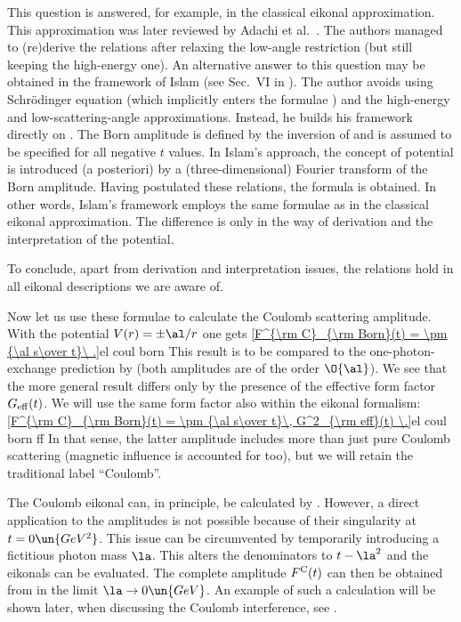 This question is answered, for example, in the classical eikonal approximation. This approximation was later reviewed by Adachi et al.~. The authors managed to (re)derive the relations  after relaxing the low-angle restriction (but still keeping the high-energy one). An alternative answer to this question may be obtained in the framework of Islam (see Sec.~VI in ). The author avoids using Schr\" odinger equation (which implicitly enters the formulae ) and the high-energy and low-scattering-angle approximations. Instead, he builds his framework directly on . The Born amplitude is defined by the inversion of  and is assumed to be specified for all negative $t$ values. In Islam's approach, the concept of potential is introduced (a posteriori) by a (three-dimensional) Fourier transform of the Born amplitude. Having postulated these relations, the formula  is obtained. In other words, Islam's framework employs the same formulae  as in the classical eikonal approximation. The difference is only in the way of derivation and the interpretation of the potential. 

To conclude, apart from derivation and interpretation issues, the relations  hold in all eikonal descriptions we are aware of.

Now let us use these formulae to calculate the Coulomb scattering amplitude. With the potential $V(r) = \pm \al/r$ one gets
\eqref{F^{\rm C}_{\rm Born}(t) = \pm {\al s\over t}\ .}{el coul born}
This result is to be compared to the one-photon-exchange prediction by   (both amplitudes are of the order $\O{\al}$). We see that the more general  result differs only by the presence of the effective form factor $G_{\rm eff}(t)$. We will use the same form factor also within the eikonal formalism:
\eqref{F^{\rm C}_{\rm Born}(t) = \pm {\al s\over t}\, G^2_{\rm eff}(t) \.}{el coul born ff}
In that sense, the latter amplitude includes more than just pure Coulomb scattering (magnetic influence is accounted for too), but we will retain the traditional label ``Coulomb''.

The Coulomb eikonal can, in principle, be calculated by . However, a direct application to the amplitudes  is not possible because of their singularity at $t=0\un{GeV^2}$. This issue can be circumvented by temporarily introducing a fictitious photon mass $\la$. This alters the denominators to $t - \la^2$ and the eikonals can be evaluated. The complete amplitude $F^{\rm C}(t)$ can then be obtained from  in the limit $\la \to 0\un{GeV}$. An example of such a calculation will be shown later, when discussing the Coulomb interference, see .

